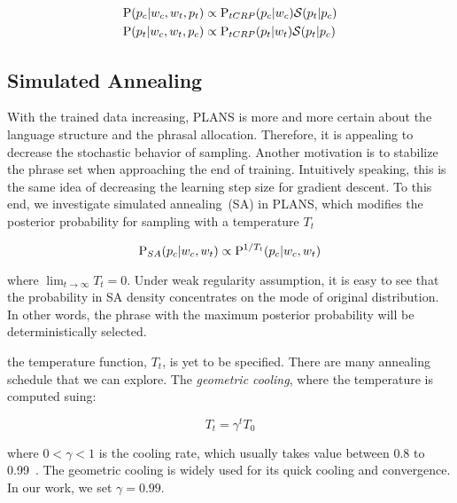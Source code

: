 \begin{align}
  \P(p_c | w_c, w_t, p_t) &\propto \P_{tCRP}(p_c | w_c)  \mathcal{S}(p_t | p_c)
    \\
  \P(p_t | w_c, w_t, p_c) &\propto \P_{tCRP}(p_t | w_t)  \mathcal{S}(p_t | p_c)
\end{align}

\subsection{Simulated Annealing}

With the trained data increasing, PLANS is more and more certain about the
language structure and the phrasal allocation. Therefore, it is appealing to
decrease the stochastic behavior of sampling. Another motivation is to stabilize
the phrase set when approaching the end of training. Intuitively speaking, this
is the same idea of decreasing the learning step size for gradient descent. To
this end, we investigate simulated annealing~(SA) in PLANS, which modifies the
posterior probability for sampling with a temperature $T_t$

\begin{equation}
  \P_{SA}(p_c | w_c, w_t) \propto \P^{1/T_t}(p_c | w_c, w_t)
\end{equation}

where $\lim_{t\rightarrow \infty} T_t = 0$. Under weak regularity assumption, it
is easy to see that the probability in SA density concentrates on the mode of
original distribution. In other words, the phrase with the maximum posterior
probability will be deterministically selected.

the temperature function, $T_t$, is yet to be specified. There are many
annealing schedule that we can explore. The \emph{geometric cooling}, where the
temperature is computed suing:

\begin{equation}
  T_t = \gamma^t T_0
\end{equation}

where $0 < \gamma < 1$ is the cooling rate, which usually takes value between
0.8 to 0.99~\cite{yuan2004annealed}. The geometric cooling is widely used for
its quick cooling and convergence. In our work, we set $\gamma = 0.99$.



